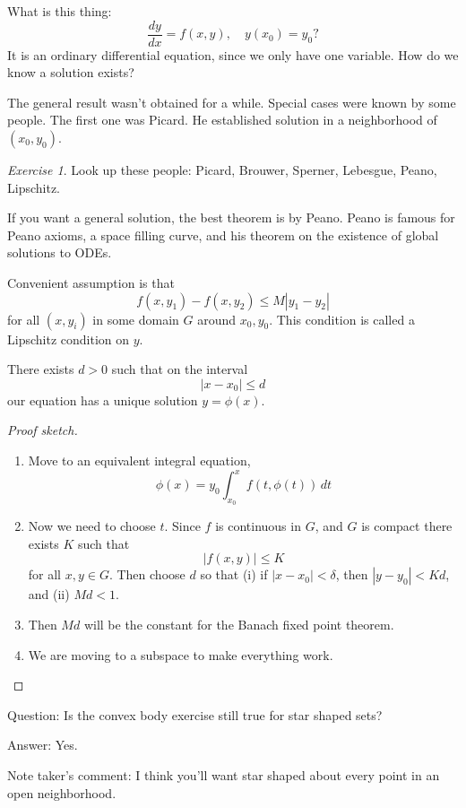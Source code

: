 \documentclass{article}
\theoremstyle{remark}
\newtheorem{exercise}{Exercise}
\begin{document}
What is this thing:
\[ \frac{dy}{dx} = f(x,y), \quad y(x_0)=y_0? \]
It is an ordinary differential equation, since 
we only have one variable.
How do we know a solution exists?

The general result wasn't obtained for a while. Special cases
were known by some people. The first one was Picard. He 
established solution in a neighborhood of $(x_0,y_0)$.

\begin{exercise}
    Look up these people: Picard, Brouwer, Sperner, Lebesgue,
    Peano, Lipschitz.
\end{exercise}

If you want a general solution, the best theorem is by Peano.
Peano is famous for Peano axioms, a space filling curve,
and his theorem on the existence of global solutions to 
ODEs.

Convenient assumption is that 
\[ f(x,y_1)-f(x,y_2) \le M |y_1-y_2| \]
for all $(x,y_i)$ in some domain $G$ around $x_0,y_0$.
This condition is called a Lipschitz condition on $y$.

\begin{theorem}[Picard]
There exists $d>0$ such that on the interval
\[ |x-x_0|\le d \]
our equation has a unique solution
$y=\phi(x)$.
\end{theorem}

\begin{proof}[Proof sketch]
    \begin{enumerate}
        \item Move to an equivalent integral equation,
            \[ \phi(x) = y_0 \int_{x_0}^x f(t,\phi(t))\,dt \]
        \item Now we need to choose $t$.
            Since $f$ is continuous in $G$, and $G$ is compact
            there exists $K$ such that 
            \[|f(x,y)| \le K\]
            for all $x,y\in G$.
            Then choose $d$ so that (i) if $|x-x_0| < \delta$,
            then $|y-y_0| < Kd$, and (ii) $Md < 1$.
        \item Then $Md$ will be the constant for the Banach
            fixed point theorem.
        \item We are moving to a subspace to make everything work.
    \end{enumerate}
\end{proof}

Question: Is the convex body exercise still true for star 
shaped sets? 

Answer: Yes. 

Note taker's comment: I think you'll want star shaped about 
every point in an open neighborhood.
\end{document}
